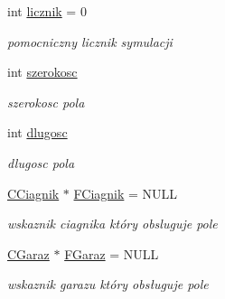\begin{DoxyCompactItemize}
\item 
\mbox{\label{class_c_pole_a5e815f6698e04dc22cdf23e9b7e4e51b}} 
int \mbox{\hyperlink{class_c_pole_a5e815f6698e04dc22cdf23e9b7e4e51b}{licznik}} = 0
\begin{DoxyCompactList}\small\item\em pomocniczny licznik symulacji \end{DoxyCompactList}\item 
\mbox{\label{class_c_pole_acce333e40bc651868d7f4a465441adab}} 
int \mbox{\hyperlink{class_c_pole_acce333e40bc651868d7f4a465441adab}{szerokosc}}
\begin{DoxyCompactList}\small\item\em szerokosc pola \end{DoxyCompactList}\item 
\mbox{\label{class_c_pole_a7bfa9aaa5ad6d2ac00ab3b1f55a03258}} 
int \mbox{\hyperlink{class_c_pole_a7bfa9aaa5ad6d2ac00ab3b1f55a03258}{dlugosc}}
\begin{DoxyCompactList}\small\item\em dlugosc pola \end{DoxyCompactList}\item 
\mbox{\label{class_c_pole_af771b51921f94dd0198a8a64e44bf4be}} 
\mbox{\hyperlink{class_c_ciagnik}{C\+Ciagnik}} $\ast$ \mbox{\hyperlink{class_c_pole_af771b51921f94dd0198a8a64e44bf4be}{F\+Ciagnik}} = N\+U\+LL
\begin{DoxyCompactList}\small\item\em wskaznik ciagnika który obsluguje pole \end{DoxyCompactList}\item 
\mbox{\label{class_c_pole_aed025ff8ea865d94f88e5b40e9ea132c}} 
\mbox{\hyperlink{class_c_garaz}{C\+Garaz}} $\ast$ \mbox{\hyperlink{class_c_pole_aed025ff8ea865d94f88e5b40e9ea132c}{F\+Garaz}} = N\+U\+LL
\begin{DoxyCompactList}\small\item\em wskaznik garazu który obsługuje pole \end{DoxyCompactList}\item 
\mbox{\label{class_c_pole_a6bdbbef0f210d916197c81af56f71ef6}} 

\end{DoxyCompactItemize}
